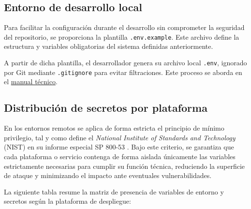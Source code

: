 \subsection{Entorno de desarrollo local}\label{subsec:env_local}

Para facilitar la configuración durante el desarrollo sin comprometer la seguridad del repositorio, se proporciona la plantilla \texttt{.env.example}. Este archivo define la estructura y variables obligatorias del sistema definidas anteriormente.

A partir de dicha plantilla, el desarrollador genera su archivo local \texttt{.env}, ignorado por Git mediante \texttt{.gitignore} para evitar filtraciones. Este proceso se aborda en el \hyperref[anexo:manual_tecnico]{manual técnico}.

\subsection{Distribución de secretos por plataforma}\label{subsec:secretos_plataformas}

En los entornos remotos se aplica de forma estricta el principio de mínimo privilegio, tal y como define el \textit{National Institute of Standards and Technology} (NIST) en su informe especial SP 800-53 \cite{nist_least_privilege}. Bajo este criterio, se garantiza que cada plataforma o servicio contenga de forma aislada únicamente las variables estrictamente necesarias para cumplir su función técnica, reduciendo la superficie de ataque y minimizando el impacto ante eventuales vulnerabilidades.

La siguiente tabla resume la matriz de presencia de variables de entorno y secretos según la plataforma de despliegue:


